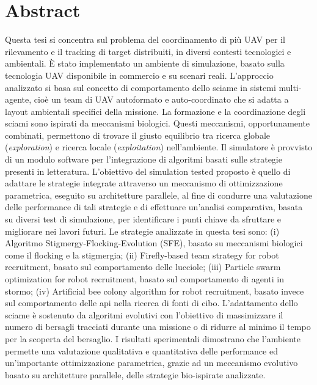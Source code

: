 \chapter*{Abstract}

Questa tesi si concentra sul problema del coordinamento di più UAV per il rilevamento e il tracking di target distribuiti, in diversi contesti tecnologici e ambientali. 
\`E stato implementato un ambiente di simulazione, basato sulla tecnologia UAV disponibile in commercio e su scenari reali. 
L'approccio analizzato si basa sul concetto di comportamento dello sciame in sistemi multi-agente, cioè un team di UAV autoformato e auto-coordinato che si adatta a layout ambientali specifici della missione. 
La formazione e la coordinazione degli sciami sono ispirati da meccanismi biologici.
Questi meccanismi, opportunamente combinati, permettono di trovare il giusto equilibrio tra ricerca globale (\textit{exploration}) e ricerca locale (\textit{exploitation}) nell'ambiente. 
Il simulatore è provvisto di un modulo software per l'integrazione di algoritmi basati sulle strategie presenti in letteratura.
L'obiettivo del simulation tested proposto è quello di adattare le strategie integrate attraverso un meccanismo di ottimizzazione parametrica, eseguito su architetture parallele, al fine di condurre una valutazione delle performance di tali strategie e di effettuare un'analisi comparativa, basata su diversi test di simulazione, per identificare i punti chiave da sfruttare e migliorare nei lavori futuri. 
Le strategie analizzate in questa tesi sono: (i) Algoritmo Stigmergy-Flocking-Evolution (SFE), basato su meccanismi biologici come il flocking e la stigmergia; (ii) Firefly-based team strategy for robot recruitment, basato sul comportamento delle lucciole; (iii) Particle swarm optimization for robot recruitment, basato sul comportamento di agenti in stormo; (iv) Artificial bee colony algorithm for robot recruitment, basato invece sul comportamento delle api nella ricerca di fonti di cibo.
L'adattamento dello sciame è sostenuto da algoritmi evolutivi con l'obiettivo di massimizzare il numero di bersagli tracciati durante una missione o di ridurre al minimo il tempo per la scoperta del bersaglio. 
I risultati sperimentali dimostrano che l'ambiente permette una valutazione qualitativa e quantitativa delle performance ed un'importante ottimizzazione parametrica, grazie ad un meccanismo evolutivo basato su architetture parallele, delle strategie bio-ispirate analizzate.

\restoregeometry 